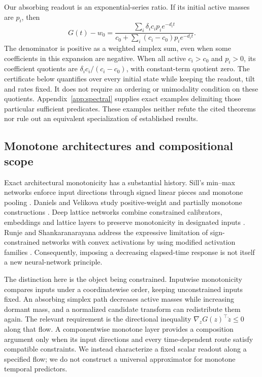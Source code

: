 \documentclass[pdflatex,sn-vancouver-num]{sn-jnl}
\theoremstyle{thmstyleone}
\begin{document}
Our absorbing readout is an exponential-series ratio. If its initial active masses are $p_i$, then
\begin{equation}\label{eq:spectral}
G(t)-w_0=
\frac{\sum_i\delta_i c_i p_i e^{-d_it}}
{c_0+\sum_i(c_i-c_0)p_i e^{-d_it}}.
\end{equation}
The denominator is positive as a weighted simplex sum, even when some coefficients in this expansion are negative. When all active $c_i>c_0$ and $p_i>0$, its coefficient quotients are $\delta_i c_i/(c_i-c_0)$, with constant-term quotient zero. The certificate below quantifies over every initial state while keeping the readout, tilt and rates fixed. It does not require an ordering or unimodality condition on these quotients. Appendix~\ref{app:spectral} supplies exact examples delimiting those particular sufficient predicates. These examples neither refute the cited theorems nor rule out an equivalent specialization of established results.

\subsection{Monotone architectures and compositional scope}
Exact architectural monotonicity has a substantial history. Sill's min--max networks enforce input directions through signed linear pieces and monotone pooling \cite{sill}. Daniels and Velikova study positive-weight and partially monotone constructions \cite{daniels}. Deep lattice networks combine constrained calibrators, embeddings and lattice layers to preserve monotonicity in designated inputs \cite{lattice}. Runje and Shankaranarayana address the expressive limitation of sign-constrained networks with convex activations by using modified activation families \cite{runje}. Consequently, imposing a decreasing elapsed-time response is not itself a new neural-network principle.

The distinction here is the object being constrained. Inputwise monotonicity compares inputs under a coordinatewise order, keeping unconstrained inputs fixed. An absorbing simplex path decreases active masses while increasing dormant mass, and a normalized candidate transform can redistribute them again. The relevant requirement is the directional inequality $\nabla_zG(z)^\top\dot z\le0$ along that flow. A componentwise monotone layer provides a composition argument only when its input directions and every time-dependent route satisfy compatible constraints. We instead characterize a fixed scalar readout along a specified flow; we do not construct a universal approximator for monotone temporal predictors.
\end{document}
